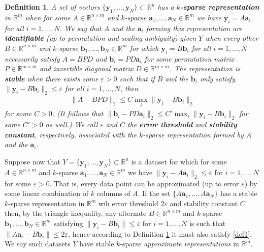 \documentclass[journal, onecolumn]{IEEEtran}
\newtheorem{definition}{Definition}
\begin{document}
\begin{definition}\label{Uniqueness}
A set of vectors $\{\mathbf{y}_1, \ldots, \mathbf{y}_N\} \subset \mathbb{R}^n$ has a \textbf{$k$-sparse representation} in $\mathbb{R}^m$ when for some $A \in \mathbb{R}^{n \times m}$ and $k$-sparse $\mathbf{a}_1, \ldots, \mathbf{a}_N \in \mathbb{R}^m$ we have $\mathbf{y}_i = A\mathbf{a}_i$ for all $i = 1, \ldots, N$. We say that $A$ and the $\mathbf{a}_i$ forming this representation are \textbf{identifiable} (up to permutation and scaling ambiguity) given $Y$ when every other $B \in \mathbb{R}^{n \times m}$ and $k$-sparse $\mathbf{b}_1, \ldots, \mathbf{b}_N \in \mathbb{R}^m$ for which $\mathbf{y}_i = B\mathbf{b}_i$ for all $i = 1, \ldots, N$ necessarily satisfy $A = BPD$ and $\mathbf{b}_i = PD\mathbf{a}_i$ for some permutation matrix $P \in \mathbb{R}^{m \times m}$ and invertible diagonal matrix $D \in \mathbb{R}^{m \times m}$. The representation is \textbf{stable} when there exists some $\varepsilon > 0$ such that if $B$ and the $\mathbf{b}_i$ only satisfy $\|\mathbf{y}_i - B\mathbf{b}_i\|_2 \leq \varepsilon$ for all $i = 1, \ldots, N$, then
\begin{align}\label{def1}
\|A - BPD\|_2 \leq C \max_i \|\mathbf{y}_i - B\mathbf{b}_i\|_2
\end{align}
for some $C>0$. (It follows that $\|\mathbf{b}_i - PD\mathbf{a}_i\|_2 \leq C' \max_i \|\mathbf{y}_i - B\mathbf{b}_i\|_2$ for some $C' > 0$ as well.) We call $\varepsilon$ and $C$ the \textbf{error threshold} and \textbf{stability constant}, respectively, associated with the $k$-sparse representation formed by $A$ and the $\mathbf{a}_i$.
\end{definition}

Suppose now that $Y = \{\mathbf{y}_1, \ldots, \mathbf{y}_N\} \subset \mathbb{R}^n$ is a dataset for which for some $A \in \mathbb{R}^{n \times m}$ and $k$-sparse $\mathbf{a}_1, \ldots, \mathbf{a}_N \in \mathbb{R}^m$ we have $\|\mathbf{y}_i - A\mathbf{a}_i\|_2 \leq \varepsilon$ for $i = 1, \ldots, N$ for some $\varepsilon > 0$. That is, every data point can be approximated (up to error $\varepsilon$) by some linear combination of $k$ columns of $A$. If the set $\{A\mathbf{a}_1, \ldots, A\mathbf{a}_N\}$ has a stable $k$-sparse representation in $\mathbb{R}^m$ wih error threshold $2\varepsilon$ and stability constant $C$ then, by the triangle inequality, any alternate $B \in \mathbb{R}^{n \times m}$ and $k$-sparse $\mathbf{b}_1, \ldots, \mathbf{b}_N \in \mathbb{R}^m$ satisfying $\|\mathbf{y}_i - B\mathbf{b}_i\| \leq \varepsilon$ for $i = 1, \ldots, N$ is such that $\|A\mathbf{a}_i - B\mathbf{b}_i\| \leq 2\varepsilon$, hence according to Definition \ref{Uniqueness} it must also satisfy \eqref{def1}. We say such datasets $Y$ have stable $k$-sparse \emph{approximate representations} in $\mathbb{R}^m$.
\end{document}
